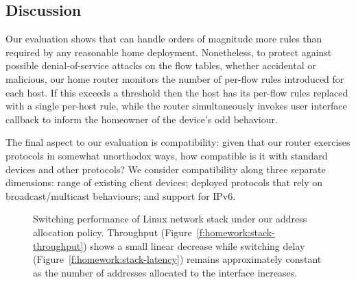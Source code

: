 \subsection{Discussion}

Our evaluation shows that \ovs can handle orders of magnitude more rules
than required by any reasonable home deployment.  Nonetheless, to protect
against possible denial-of-service attacks on the flow tables, whether
accidental or malicious, our home router monitors the number of
per-flow rules introduced for each host.  If this exceeds a threshold then
the host has its per-flow rules replaced with a single per-host rule, while the
router simultaneously invokes user interface callback to inform the homeowner of the
device's odd behaviour. 

The final aspect to our evaluation is compatibility: given that our router
exercises protocols in somewhat unorthodox ways, how compatible is it with
standard devices and other protocols?  We consider compatibility along three
separate dimensions: range of existing client devices; deployed protocols that
rely on broadcast/multicast behaviours; and support for IPv6. 

\begin{figure} 
  \centering 
  \caption{\label{f:stack-throughput}Switching performance of Linux network
    stack under our address allocation policy. Throughput
    (Figure~\ref{f:homework:stack-throughput}) shows a
    small linear decrease while switching delay
    (Figure~\ref{f:homework:stack-latency}) remains
    approximately constant as the number of addresses allocated to the interface
    increases.} \end{figure}

